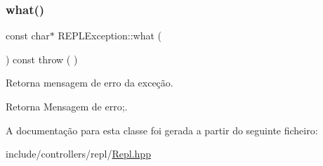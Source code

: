 \subsubsection{\texorpdfstring{what()}{what()}}
{\footnotesize\ttfamily const char$\ast$ R\+E\+P\+L\+Exception\+::what (\begin{DoxyParamCaption}{ }\end{DoxyParamCaption}) const throw ( ) \hspace{0.3cm}{\ttfamily [inline]}}

Retorna mensagem de erro da exceção. \begin{DoxyReturn}{Retorna}
Mensagem de erro;. 
\end{DoxyReturn}


A documentação para esta classe foi gerada a partir do seguinte ficheiro\+:\begin{DoxyCompactItemize}
\item 
include/controllers/repl/\mbox{\hyperlink{Repl_8hpp}{Repl.\+hpp}}\end{DoxyCompactItemize}
